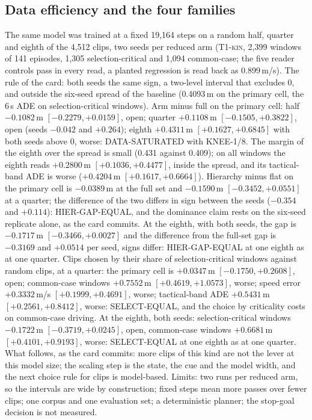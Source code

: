 \documentclass[10pt,twocolumn]{article}
\makeatletter
\theoremstyle{remark}
\newcommand{\tier}[1]{\textsc{\small #1}}
\renewcommand\paragraph{\@startsection{paragraph}{4}{\z@}{1.6ex \@plus .5ex \@minus .2ex}{-1em}{\normalfont\normalsize\bfseries}}
\makeatother
\begin{document}
\subsection{Data efficiency and the four families}\label{sec:dataeff}
\paragraph{Data efficiency (final read, six baseline seeds).} The same model was trained at a fixed 19,164 steps on a random half, quarter and eighth of the 4,512 clips, two seeds per reduced arm (\tier{T1-kin}, 2,399 windows of 141 episodes, 1,305 selection-critical and 1,094 common-case; the five reader controls pass in every read, a planted regression is read back as 0.899\,m/s). The rule of the card: both seeds the same sign, a two-level interval that excludes 0, and outside the six-seed spread of the baseline (0.4093\,m on the primary cell, the 6\,s ADE on selection-critical windows). Arm minus full on the primary cell: half $-0.1082$\,m $[-0.2279,+0.0159]$, open; quarter $+0.1108$\,m $[-0.1505,+0.3822]$, open (seeds $-0.042$ and $+0.264$); eighth $+0.4311$\,m $[+0.1627,+0.6845]$ with both seeds above 0, worse: DATA-SATURATED with KNEE-1/8. The margin of the eighth over the spread is small (0.431 against 0.409); on all windows the eighth reads $+0.2800$\,m $[+0.1036,+0.4477]$, inside the spread, and its tactical-band ADE is worse ($+0.4204$\,m $[+0.1617,+0.6664]$). Hierarchy minus flat on the primary cell is $-0.0389$\,m at the full set and $-0.1590$\,m $[-0.3452,+0.0551]$ at a quarter; the difference of the two differs in sign between the seeds ($-0.354$ and $+0.114$): HIER-GAP-EQUAL, and the dominance claim rests on the six-seed replicate alone, as the card commits. At the eighth, with both seeds, the gap is $-0.1717$\,m $[-0.3466,+0.0027]$ and the difference from the full-set gap is $-0.3169$ and $+0.0514$ per seed, signs differ: HIER-GAP-EQUAL at one eighth as at one quarter. Clips chosen by their share of selection-critical windows against random clips, at a quarter: the primary cell is $+0.0347$\,m $[-0.1750,+0.2608]$, open; common-case windows $+0.7552$\,m $[+0.4619,+1.0573]$, worse; speed error $+0.3332$\,m/s $[+0.1999,+0.4691]$, worse; tactical-band ADE $+0.5431$\,m $[+0.2561,+0.8412]$, worse: SELECT-EQUAL, and the choice by criticality costs on common-case driving. At the eighth, both seeds: selection-critical windows $-0.1722$\,m $[-0.3719,+0.0245]$, open, common-case windows $+0.6681$\,m $[+0.4101,+0.9193]$, worse: SELECT-EQUAL at one eighth as at one quarter. What follows, as the card commits: more clips of this kind are not the lever at this model size; the scaling step is the state, the cue and the model width, and the next choice rule for clips is model-based. Limits: two runs per reduced arm, so the intervals are wide by construction; fixed steps mean more passes over fewer clips; one corpus and one evaluation set; a deterministic planner; the stop-goal decision is not measured.
\end{document}
